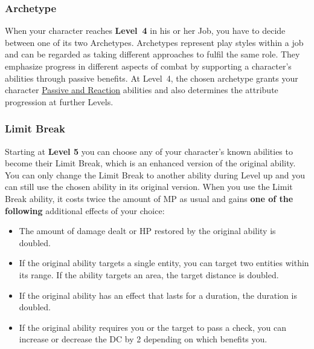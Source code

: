 \subsubsection*{Archetype}
When your character reaches \textbf{Level~4} in his or her Job, you have to decide between one of its two Archetypes. 
Archetypes represent play styles within a job and can be regarded as taking different approaches to fulfil the same role.
They emphasize progress in different aspects of combat by supporting a character's abilities through passive benefits. 
At Level~4, the chosen archetype grants your character \hyperlink{sabilities}{Passive and Reaction} abilities and also determines the attribute progression at further Levels.
\pagebreak
\subsubsection*{Limit Break}
Starting at \textbf{Level 5} you can choose any of your character's known abilities to become their Limit Break, which is an enhanced version of the original ability.
You can only change the Limit Break to another ability during Level up and you can still use the chosen ability in its original version.
When you use the Limit Break ability, it costs twice the amount of MP as usual and gains \textbf{one of the following} additional effects of your choice:
\begin{itemize}[leftmargin=*]  
	\item The amount of damage dealt or HP restored by the original ability is doubled.
	\item If the original ability targets a single entity, you can target two entities within its range. If the ability targets an area, the target distance  is doubled.
	\item If the original ability has an effect that lasts for a duration, the duration is doubled.	
	\item If the original ability requires you or the target to pass a check, you can increase or decrease the DC by 2 depending on which benefits you.	
\end{itemize}

\vspace{0.7cm}

